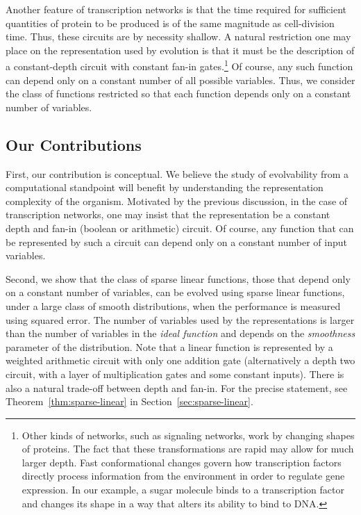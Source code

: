 Another feature of transcription networks is that the time required for
sufficient quantities of protein to be produced is of the same magnitude as
cell-division time. Thus, these circuits are by necessity shallow.
A natural restriction one may place on the representation used by
evolution is that it must be the description of a constant-depth circuit with
constant fan-in gates.\footnote{Other kinds of networks, such
as signaling networks, work by changing shapes of proteins. The fact that these
transformations are rapid may allow for much larger depth.
Fast conformational changes govern how transcription factors directly process 
information from the environment in order to regulate gene expression.
In our example, a sugar molecule binds to a transcription factor and changes
its shape in a way that alters its ability to bind to DNA.}
Of course, any such function can depend only on a
constant number of all possible variables. Thus, we consider the class of
functions restricted so that each function depends only on a constant number of
variables.

\subsection{Our Contributions}

First, our contribution is conceptual. We believe the study of evolvability from
a computational standpoint will benefit by understanding the representation
complexity of the organism. Motivated by the previous discussion, in the case of
transcription networks, one may insist that the representation be a
constant depth and fan-in (boolean or arithmetic) circuit. Of course, any
function that can be represented by such a circuit can depend only on a constant
number of input variables.

Second, we show that the class of sparse linear functions, those that depend
only on a constant number of variables, can be evolved using sparse linear
functions, under a large class of smooth distributions, when the performance is
measured using squared error. The number of variables used by the
representations is larger than the number of variables in the \emph{ideal
function} and depends on the \emph{smoothness} parameter of the distribution.
Note that a linear function is represented by a weighted arithmetic circuit with
only one addition gate (alternatively a depth two circuit, with a layer of
multiplication gates and some constant inputs). There is also a natural
trade-off between depth and fan-in. For the precise statement, see
Theorem~\ref{thm:sparse-linear} in Section~\ref{sec:sparse-linear}.

